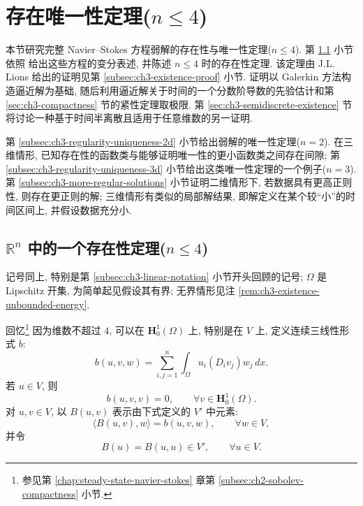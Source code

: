 \hypertarget{chapter-03-section-03-page-204}{}
\section{存在唯一性定理($n\leq4$)}
\label{sec:ch3-existence-uniqueness}
本节研究完整 Navier--Stokes 方程弱解的存在性与唯一性定理($n\leq4$). 第 \ref{subsec:ch3-existence-theorem} 小节依照  给出这些方程的变分表述, 并陈述 $n\leq4$ 时的存在性定理. 该定理由 J.L. Lions 给出的证明见第 \ref{subsec:ch3-existence-proof} 小节. 证明以 Galerkin 方法构造逼近解为基础, 随后利用逼近解关于时间的一个分数阶导数的先验估计和第 \ref{sec:ch3-compactness} 节的紧性定理取极限. 第 \ref{sec:ch3-semidiscrete-existence} 节将讨论一种基于时间半离散且适用于任意维数的另一证明.

第 \ref{subsec:ch3-regularity-uniqueness-2d} 小节给出弱解的唯一性定理($n=2$). 在三维情形, 已知存在性的函数类与能够证明唯一性的更小函数类之间存在间隙; 第 \ref{subsec:ch3-regularity-uniqueness-3d} 小节给出这类唯一性定理的一个例子($n=3$). 第 \ref{subsec:ch3-more-regular-solutions} 小节证明二维情形下, 若数据具有更高正则性, 则存在更正则的解; 三维情形有类似的局部解结果, 即解定义在某个较“小”的时间区间上, 并假设数据充分小.

\subsection{$\mathbb R^n$ 中的一个存在性定理($n\leq4$)}
\label{subsec:ch3-existence-theorem}
记号同上, 特别是第 \ref{subsec:ch3-linear-notation} 小节开头回顾的记号; $\Omega$ 是 Lipschitz 开集, 为简单起见假设其有界; 无界情形见注 \ref{rem:ch3-existence-unbounded-energy}.

回忆\footnote{参见第 \ref{chap:steady-state-navier-stokes} 章第 \ref{subsec:ch2-sobolev-compactness} 小节.} 因为维数不超过 $4$, 可以在 $\mathbf H_0^1(\Omega)$ 上, 特别是在 $V$ 上, 定义连续三线性形式 $b$:
\begin{equation}
b(u,v,w)=\sum_{i,j=1}^{n}\int_\Omega u_i(D_i v_j)w_j\,dx.
\label{eq:ch3-existence-trilinear-form}
\end{equation}
若 $u\in V$, 则
\begin{equation}
b(u,v,v)=0,
\qquad\forall v\in\mathbf H_0^1(\Omega).
\label{eq:ch3-existence-skew-cancellation}
\end{equation}
对 $u,v\in V$, 以 $B(u,v)$ 表示由下式定义的 $V'$ 中元素:
\begin{equation}
\langle B(u,v),w\rangle=b(u,v,w),
\qquad\forall w\in V,
\label{eq:ch3-existence-bilinear-operator}
\end{equation}
并令
\begin{equation}
B(u)=B(u,u)\in V',
\qquad\forall u\in V.
\label{eq:ch3-existence-nonlinear-operator}
\end{equation}

